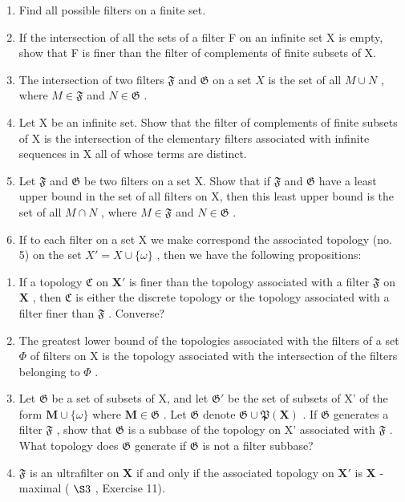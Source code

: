 \begin{enumerate}
\def\labelenumi{\arabic{enumi})}
\item
  Find all possible filters on a finite set.
\item
  If the intersection of all the sets of a filter F on an infinite set X is empty, show that F is finer than the filter of complements of finite subsets of X.
\item
  The intersection of two filters \(\mathfrak{F}\) and \(\mathfrak{G}\) on a set \(X\) is the set of all \(M \cup N\) , where \(M \in \mathfrak{F}\) and \(N \in \mathfrak{G}\) .
\item
  Let X be an infinite set. Show that the filter of complements of finite subsets of X is the intersection of the elementary filters associated with infinite sequences in X all of whose terms are distinct.
\item
  Let \(\mathfrak{F}\) and \(\mathfrak{G}\) be two filters on a set X. Show that if \(\mathfrak{F}\) and \(\mathfrak{G}\) have a least upper bound in the set of all filters on X, then this least upper bound is the set of all \(M \cap N\) , where \(M \in \mathfrak{F}\) and \(N \in \mathfrak{G}\) .
\item
  If to each filter on a set X we make correspond the associated topology (no. 5) on the set \(X' = X \cup \{\omega\}\) , then we have the following propositions:
\end{enumerate}

\begin{enumerate}
\def\labelenumi{\alph{enumi})}
\item
  If a topology \(\mathfrak{C}\) on \(\mathbf{X}'\) is finer than the topology associated with a filter \(\mathfrak{F}\) on \(\mathbf{X}\) , then \(\mathfrak{C}\) is either the discrete topology or the topology associated with a filter finer than \(\mathfrak{F}\) . Converse?
\item
  The greatest lower bound of the topologies associated with the filters of a set \(\Phi\) of filters on X is the topology associated with the intersection of the filters belonging to \(\Phi\) .
\item
  Let \(\mathfrak{G}\) be a set of subsets of X, and let \(\mathfrak{G}'\) be the set of subsets of X' of the form \(\mathbf{M} \cup \{\omega\}\) where \(\mathbf{M} \in \mathfrak{G}\) . Let \(\mathfrak{G}\) denote \(\mathfrak{G} \cup \mathfrak{P}(\mathbf{X})\) . If \(\mathfrak{G}\) generates a filter \(\mathfrak{F}\) , show that \(\mathfrak{G}\) is a subbase of the topology on X' associated with \(\mathfrak{F}\) . What topology does \(\mathfrak{G}\) generate if \(\mathfrak{G}\) is not a filter subbase?
\item
  \(\mathfrak{F}\) is an ultrafilter on \(\mathbf{X}\) if and only if the associated topology on \(\mathbf{X}'\) is \(\mathbf{X}\) -maximal ( \(\S 3\) , Exercise 11).
\end{enumerate}

